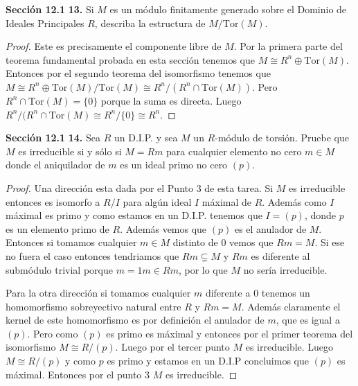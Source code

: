 \documentclass[letter,twoside,12pt]{article}
\begin{document}
\textbf{Sección 12.1} \textbf{13.} Si $ M $ es un módulo finitamente generado sobre el Dominio de Ideales Principales $ R $, describa la estructura de $ M/\text{Tor}(M) $.

\begin{proof}
Este es precisamente el componente libre de $ M $.
Por la primera parte del teorema fundamental probada en esta sección tenemos que $M \cong R^n \oplus \text{Tor}(M) $. Entonces por el segundo teorema del isomorfismo tenemos que  $M \cong R^n \oplus \text{Tor}(M)/\text{Tor}(M) \cong R^n/(R^n \cap \text{Tor}(M)) $. Pero $ R^n \cap \text{Tor}(M) = \{0\} $ porque la suma es directa. Luego $  R^n/(R^n \cap \text{Tor}(M) \cong R^{n}/\{0\}  \cong R^n$. 
\end{proof}

\textbf{Sección 12.1} \textbf{14.} Sea $ R $ un D.I.P. y sea $ M $ un $ R $-módulo de torsión. Pruebe que $ M $ es irreducible si y sólo si $ M = Rm $ para cualquier elemento no cero $ m \in M $ donde el aniquilador de $ m $ es un ideal primo no cero $ (p) $.

\begin{proof}
Una dirección esta dada por el Punto 3 de esta tarea. Si $ M $ es irreducible entonces es isomorfo a $ R/I $ para algún ideal $ I $ máximal de $R$. Además como $I$ máximal es primo y como estamos en un D.I.P. tenemos que $ I  = (p) $, donde $ p $ es un elemento primo de $ R $. Además vemos que $ (p) $ es el anulador de $M$. Entonces si tomamos cualquier $m \in M $ distinto de 0 vemos que $ Rm = M$. Si ese no fuera el caso entonces tendriamos que $ Rm \subsetneq M $ y $Rm$ es diferente al submódulo trivial porque $ m  = 1m \in Rm $, por lo que $ M $ no sería irreducible.

Para la otra dirección si tomamos cualquier $ m $ diferente a 0 tenemos un homomorfismo sobreyectivo natural entre $ R $ y $ Rm = M $. Además claramente el kernel de este homomorfismo es por definición el anulador de $ m $, que es igual a $ (p) $. Pero como $ (p) $ es primo es máximal y entonces por el primer teorema del isomorfismo $ M \cong R/(p) $. Luego por el tercer punto $ M $ es irreducible. Luego $ M \cong R/(p) $ y como $ p $ es primo y estamos en un D.I.P concluimos que $ (p) $ es máximal. Entonces por el punto 3 $ M $ es irreducible.
 \end{proof}
\end{document}
